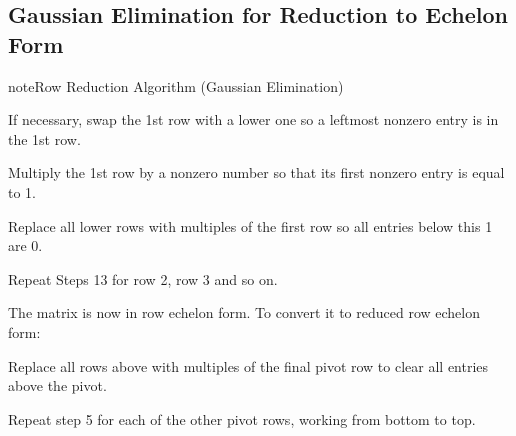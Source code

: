 \documentclass[letterpaper,10pt,english]{jupyterBook}
\begin{document}
\subsection{Gaussian Elimination for Reduction to Echelon Form}
\label{\detokenize{LinearAlgebra/linear_systems_matrices/echelon_form:gaussian-elimination-for-reduction-to-echelon-form}}
\begin{sphinxadmonition}{note}{Row Reduction Algorithm (Gaussian Elimination)}

\sphinxAtStartPar
{} If necessary, swap the 1st row with a lower one so a leftmost nonzero entry is in the 1st row.

\sphinxAtStartPar
{} Multiply the 1st row by a nonzero number so that its first nonzero entry is equal to 1.

\sphinxAtStartPar
{} Replace all lower rows with multiples of the first row so all entries below this 1 are 0.

\sphinxAtStartPar
{} Repeat Steps 1\sphinxhyphen{}3 for row 2, row 3 and so on.

\sphinxAtStartPar
The matrix is now in row echelon form. To convert it to reduced row echelon form:

\sphinxAtStartPar
{} Replace all rows above with multiples of the final pivot row to clear all entries above the pivot.

\sphinxAtStartPar
{} Repeat step 5 for each of the other pivot rows, working from bottom to top.
\end{sphinxadmonition}
\end{document}
